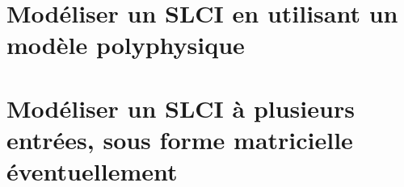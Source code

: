 \graphicspath{{\repStyle/png/}{../SLCI/SLCI-03-SchemaBlocs/48_Quille/images/}} 
 
 
\graphicspath{{\repStyle/png/}{../SLCI/SLCI-03-SchemaBlocs/500_Divers/images/}} 
 
 
\graphicspath{{\repStyle/png/}{../SLCI/SLCI-03-SchemaBlocs/505_Divers/images/}} 
 
 
\graphicspath{{\repStyle/png/}{../SLCI/SLCI-03-SchemaBlocs/512_Divers/images/}} 
 
 
\graphicspath{{\repStyle/png/}{../SLCI/SLCI-03-SchemaBlocs/51_MCC/images/}} 
 
 
\graphicspath{{\repStyle/png/}{../SLCI/SLCI-03-SchemaBlocs/52_Verin/images/}} 
 
 
\graphicspath{{\repStyle/png/}{../SLCI/SLCI-03-SchemaBlocs/53_BancEpreuveHydraulique/images/}} 
 
 
\graphicspath{{\repStyle/png/}{../SLCI/SLCI-03-SchemaBlocs/71_Robovolc/images/}} 
 
 
\graphicspath{{\repStyle/png/}{../SLCI/SLCI-03-SchemaBlocs/77_ProtheseTibia/images/}} 
 
 
\graphicspath{{\repStyle/png/}{../SLCI/SLCI-03-SchemaBlocs/78_RobotDaVinci/images/}} 
 
 
\graphicspath{{\repStyle/png/}{../SLCI/SLCI-03-SchemaBlocs/79_Tuyere/images/}} 
 
 
\graphicspath{{\repStyle/png/}{../SLCI/SLCI-03-SchemaBlocs/80_Clever/images/}} 
 
 
\section{Modéliser un SLCI en utilisant un modèle polyphysique} 
\section{Modéliser un SLCI à plusieurs entrées, sous forme matricielle éventuellement} 
